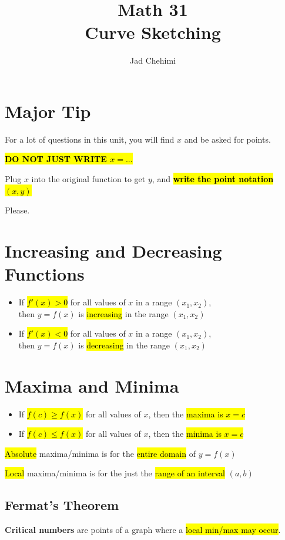 \documentclass[a4paper,12pt]{article}
\title{Math 31 \\ Curve Sketching}
\author{Jad Chehimi}
\begin{document}
\maketitle

\tableofcontents

\pagebreak

\section{Major Tip}
For a lot of questions in this unit, you will find $x$ and be asked for points.

\textbf{\hl{DO NOT JUST WRITE $x=...$}}

Plug $x$ into the original function to get $y$, and \textbf{\hl{write the point notation $(x, y)$}}

Please.

\section{Increasing and Decreasing Functions}
\begin{itemize}
    \item{If \hl{$f'(x) > 0$} for all values of $x$ in a range $(x_1, x_2)$,\\then $y = f(x)$ is \hl{increasing} in the range $(x_1, x_2)$}
    \item{If \hl{$f'(x) < 0$} for all values of $x$ in a range $(x_1, x_2)$,\\then $y = f(x)$ is \hl{decreasing} in the range $(x_1, x_2)$}
\end{itemize}

\section{Maxima and Minima}
\begin{itemize}
    \item{If \hl{$f(c) \geq f(x)$} for all values of $x$, then the \hl{maxima is $x = c$}}
    \item{If \hl{$f(c) \leq f(x)$} for all values of $x$, then the \hl{minima is $x = c$}}
\end{itemize}

\hl{Absolute} maxima/minima is for the \hl{entire domain} of $y = f(x)$

\hl{Local} maxima/minima is for the just the \hl{range of an interval} $(a, b)$

\subsection{Fermat's Theorem}
\textbf{Critical numbers} are points of a graph where a \hl{local min/max may occur}.
\end{document}
